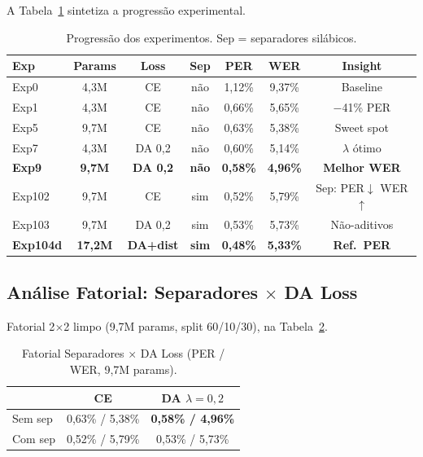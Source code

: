 \documentclass[12pt]{article}
\begin{document}
A Tabela~\ref{tab:experiments} sintetiza a progress\~ao experimental.

\begin{table}[ht]
\centering
\caption{Progress\~ao dos experimentos. Sep = separadores sil\'abicos.}
\label{tab:experiments}
\begin{tabular}{lcccccc}
\toprule
\textbf{Exp} & \textbf{Params} & \textbf{Loss} & \textbf{Sep}
  & \textbf{PER} & \textbf{WER} & \textbf{Insight} \\
\midrule
Exp0  & 4,3M  & CE       & n\~ao & 1,12\% & 9,37\% & Baseline \\
Exp1  & 4,3M  & CE       & n\~ao & 0,66\% & 5,65\% & $-$41\% PER \\
Exp5  & 9,7M  & CE       & n\~ao & 0,63\% & 5,38\% & Sweet spot \\
Exp7  & 4,3M  & DA 0,2   & n\~ao & 0,60\% & 5,14\% & $\lambda$ \'otimo \\
\textbf{Exp9}  & \textbf{9,7M}  & \textbf{DA 0,2}   & \textbf{n\~ao}
  & \textbf{0,58\%} & \textbf{4,96\%} & \textbf{Melhor WER} \\
Exp102 & 9,7M & CE       & sim   & 0,52\% & 5,79\% & Sep: PER$\downarrow$ WER$\uparrow$ \\
Exp103 & 9,7M & DA 0,2   & sim   & 0,53\% & 5,73\% & N\~ao-aditivos \\
\textbf{Exp104d} & \textbf{17,2M} & \textbf{DA+dist} & \textbf{sim}
  & \textbf{0,48\%} & \textbf{5,33\%} & \textbf{Ref.\ PER} \\
\bottomrule
\end{tabular}
\end{table}

\subsection{An\'alise Fatorial: Separadores $\times$ DA Loss}

Fatorial 2$\times$2 limpo (9,7M params, split 60/10/30), na
Tabela~\ref{tab:factorial}.

\begin{table}[ht]
\centering
\caption{Fatorial Separadores $\times$ DA Loss (PER / WER, 9,7M params).}
\label{tab:factorial}
\begin{tabular}{lcc}
\toprule
 & \textbf{CE} & \textbf{DA $\lambda{=}0{,}2$} \\
\midrule
Sem sep & 0,63\% / 5,38\% & \textbf{0,58\% / 4,96\%} \\
Com sep & 0,52\% / 5,79\% & 0,53\% / 5,73\% \\
\bottomrule
\end{tabular}
\end{table}
\end{document}
